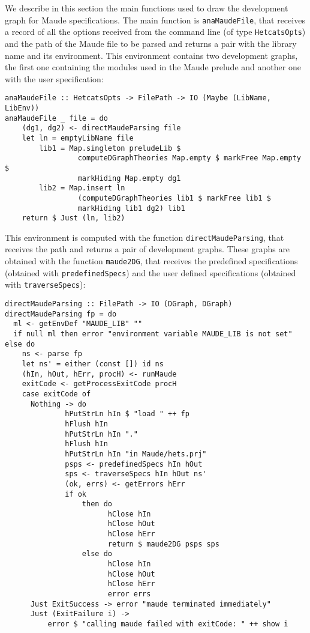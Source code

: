 
We describe in this section the main functions used to draw the
development graph for Maude specifications. The main function is
\verb"anaMaudeFile", that receives a record of all the options received
from the command line (of type \verb"HetcatsOpts") and the path of
the Maude file to be parsed and returns a pair with the library
name and its environment. This environment contains two development
graphs, the first one containing the modules used in the Maude prelude
and another one with the user specification:

{\codesize
\begin{verbatim}
anaMaudeFile :: HetcatsOpts -> FilePath -> IO (Maybe (LibName, LibEnv))
anaMaudeFile _ file = do
    (dg1, dg2) <- directMaudeParsing file
    let ln = emptyLibName file
        lib1 = Map.singleton preludeLib $
                 computeDGraphTheories Map.empty $ markFree Map.empty $
                 markHiding Map.empty dg1
        lib2 = Map.insert ln
                 (computeDGraphTheories lib1 $ markFree lib1 $
                 markHiding lib1 dg2) lib1
    return $ Just (ln, lib2)
\end{verbatim}
}

This environment is computed with the function
\verb"directMaudeParsing", that receives the path and returns
a pair of development graphs.
These graphs are obtained with the function \verb"maude2DG", that receives
the predefined specifications (obtained with \verb"predefinedSpecs")
and the user defined specifications (obtained with \verb"traverseSpecs"):

{\codesize
\begin{verbatim}
directMaudeParsing :: FilePath -> IO (DGraph, DGraph)
directMaudeParsing fp = do
  ml <- getEnvDef "MAUDE_LIB" ""
  if null ml then error "environment variable MAUDE_LIB is not set" else do
    ns <- parse fp
    let ns' = either (const []) id ns
    (hIn, hOut, hErr, procH) <- runMaude
    exitCode <- getProcessExitCode procH
    case exitCode of
      Nothing -> do
              hPutStrLn hIn $ "load " ++ fp
              hFlush hIn
              hPutStrLn hIn "."
              hFlush hIn
              hPutStrLn hIn "in Maude/hets.prj"
              psps <- predefinedSpecs hIn hOut
              sps <- traverseSpecs hIn hOut ns'
              (ok, errs) <- getErrors hErr
              if ok
                  then do
                        hClose hIn
                        hClose hOut
                        hClose hErr
                        return $ maude2DG psps sps
                  else do
                        hClose hIn
                        hClose hOut
                        hClose hErr
                        error errs
      Just ExitSuccess -> error "maude terminated immediately"
      Just (ExitFailure i) ->
          error $ "calling maude failed with exitCode: " ++ show i
\end{verbatim}
}

